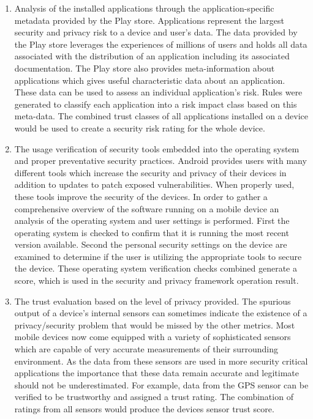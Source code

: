 \begin{enumerate}
\item Analysis of the installed applications through the application-specific metadata provided by the Play store. Applications represent the largest security and privacy risk to a device and user's data. The data provided by the Play store leverages the experiences of millions of users and holds all data associated with the distribution of an application including its associated documentation. The Play store also provides meta-information about applications which gives useful characteristic data about an application. These data can be used to assess an individual application's risk. Rules were generated to classify each application into a risk impact class based on this meta-data. The combined trust classes of all applications installed on a device would be used to create a security risk rating for the whole device.

\item The usage verification of security tools embedded into the operating system and proper preventative security practices. Android provides users with many different tools which increase the security and privacy of their devices in addition to updates to patch exposed vulnerabilities. When properly used, these tools improve the security of the devices. In order to gather a comprehensive overview of the software running on a mobile device an analysis of the operating system and user settings is performed. First the operating system is checked to confirm that it is running the most recent version available. Second the personal security settings on the device are examined to determine if the user is utilizing the appropriate tools to secure the device. These operating system verification checks combined generate a score, which is used in the security and privacy framework operation result.

\item The trust evaluation based on the level of privacy provided.  
The spurious output of a device's internal sensors can sometimes indicate the existence of a privacy/security problem 
that would be missed by the other metrics. Most mobile devices now come equipped with a variety of sophisticated sensors which are capable of very accurate measurements of their surrounding environment. 
As the data from these sensors are used in more security critical applications the importance that these data remain accurate and legitimate should not be underestimated. For example, data from the GPS sensor can be verified to be trustworthy and assigned a trust rating. The combination of ratings from all sensors would produce the devices sensor trust score.
\end{enumerate}


